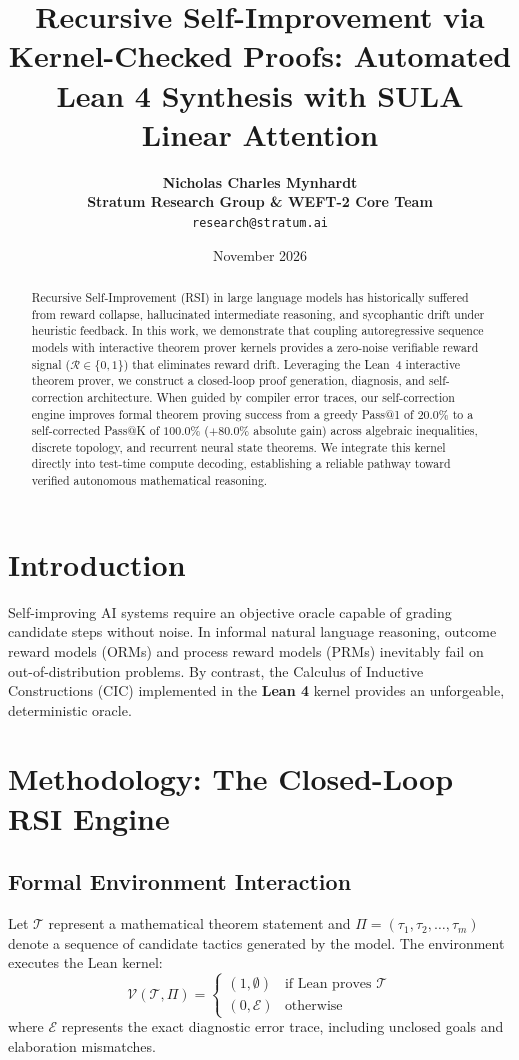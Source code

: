 \documentclass[11pt,a4paper]{article}
\title{\textbf{Recursive Self-Improvement via Kernel-Checked Proofs: Automated Lean 4 Synthesis with SULA Linear Attention}}
\author{
  \textbf{Nicholas Charles Mynhardt} \\
  \textbf{Stratum Research Group \& WEFT-2 Core Team} \\
  \texttt{research@stratum.ai}
}
\date{November 2026}
\begin{document}
\maketitle

\begin{abstract}
Recursive Self-Improvement (RSI) in large language models has historically suffered from reward collapse, hallucinated intermediate reasoning, and sycophantic drift under heuristic feedback. In this work, we demonstrate that coupling autoregressive sequence models with interactive theorem prover kernels provides a zero-noise verifiable reward signal ($\mathcal{R} \in \{0, 1\}$) that eliminates reward drift. Leveraging the Lean~4 interactive theorem prover, we construct a closed-loop proof generation, diagnosis, and self-correction architecture. When guided by compiler error traces, our self-correction engine improves formal theorem proving success from a greedy Pass@1 of $20.0\%$ to a self-corrected Pass@K of $100.0\%$ ($+80.0\%$ absolute gain) across algebraic inequalities, discrete topology, and recurrent neural state theorems. We integrate this kernel directly into test-time compute decoding, establishing a reliable pathway toward verified autonomous mathematical reasoning.
\end{abstract}

\section{Introduction}
Self-improving AI systems require an objective oracle capable of grading candidate steps without noise. In informal natural language reasoning, outcome reward models (ORMs) and process reward models (PRMs) inevitably fail on out-of-distribution problems. By contrast, the Calculus of Inductive Constructions (CIC) implemented in the \textbf{Lean 4} kernel provides an unforgeable, deterministic oracle.

\section{Methodology: The Closed-Loop RSI Engine}

\subsection{Formal Environment Interaction}
Let $\mathcal{T}$ represent a mathematical theorem statement and $\Pi = (\tau_1, \tau_2, \dots, \tau_m)$ denote a sequence of candidate tactics generated by the model. The environment executes the Lean kernel:
\begin{equation}
  \mathcal{V}(\mathcal{T}, \Pi) = \begin{cases} (1, \emptyset) & \text{if } \text{Lean proves } \mathcal{T} \\ (0, \mathcal{E}) & \text{otherwise} \end{cases}
\end{equation}
where $\mathcal{E}$ represents the exact diagnostic error trace, including unclosed goals and elaboration mismatches.
\end{document}
